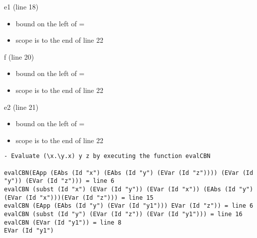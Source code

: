 \documentclass{article}
\theoremstyle{theorem}
\theoremstyle{definition}
\theoremstyle{remark}
\begin{document}
\indent
e1 (line 18)
\begin{itemize}
  \item bound on the left of =
  \item scope is to the end of line 22
\end{itemize}

\indent
f (line 20)
\begin{itemize}
  \item bound on the left of =
  \item scope is to the end of line 22
\end{itemize}

\indent
e2 (line 21)
\begin{itemize}
  \item bound on the left of =
  \item scope is to the end of line 22
\end{itemize}

\begin{lstlisting}
- Evaluate (\x.\y.x) y z by executing the function evalCBN

evalCBN(EApp (EAbs (Id "x") (EAbs (Id "y") (EVar (Id "z")))) (EVar (Id "y")) (EVar (Id "z"))) = line 6
evalCBN (subst (Id "x") (EVar (Id "y")) (EVar (Id "x")) (EAbs (Id "y") (EVar (Id "x")))(EVar (Id "z"))) = line 15
evalCBN (EApp (EAbs (Id "y") (EVar (Id "y1"))) EVar (Id "z")) = line 6
evalCBN (subst (Id "y") (EVar (Id "z")) (EVar (Id "y1"))) = line 16
evalCBN (EVar (Id "y1")) = line 8
EVar (Id "y1")
\end{lstlisting}
%
\end{document}
